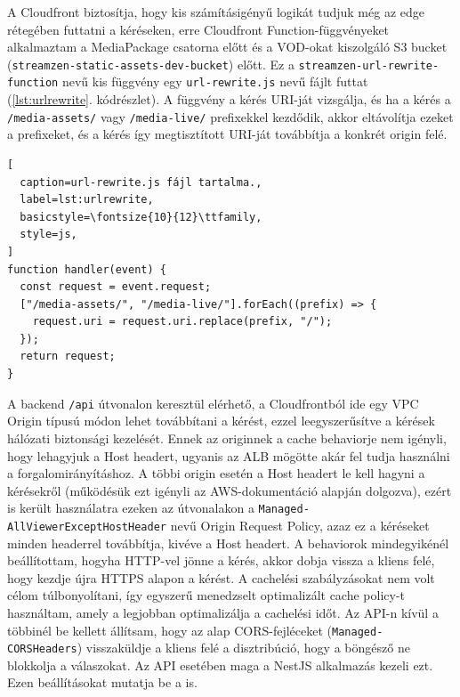 A Cloudfront biztosítja, hogy kis számításigényű logikát tudjuk még az edge rétegében futtatni a kéréseken, erre Cloudfront Function-függvényeket alkalmaztam a MediaPackage csatorna előtt és a VOD-okat kiszolgáló S3 bucket (\verb|streamzen-static-assets-dev-bucket|) előtt. Ez a \verb|streamzen-url-rewrite-function| nevű kis függvény egy \verb|url-rewrite.js| nevű fájlt futtat (\ref{lst:urlrewrite}. kódrészlet). A függvény a kérés URI-ját vizsgálja, és ha a kérés a \verb|/media-assets/| vagy \verb|/media-live/| prefixekkel kezdődik, akkor eltávolítja ezeket a prefixeket, és a kérés így megtisztított URI-ját továbbítja a konkrét origin felé.

\begin{minipage}{0.92\textwidth}
  \begin{lstlisting}[
  caption=url-rewrite.js fájl tartalma.,
  label=lst:urlrewrite,
  basicstyle=\fontsize{10}{12}\ttfamily,
  style=js,
]
function handler(event) {
  const request = event.request;
  ["/media-assets/", "/media-live/"].forEach((prefix) => {
    request.uri = request.uri.replace(prefix, "/");
  });
  return request;
}
\end{lstlisting}
\end{minipage}

A backend \verb|/api| útvonalon keresztül elérhető, a Cloudfrontból ide egy VPC Origin típusú módon lehet továbbítani a kérést, ezzel leegyszerűsítve a kérések hálózati biztonsági kezelését. Ennek az originnek a cache behaviorje nem igényli, hogy lehagyjuk a Host headert, ugyanis az ALB mögötte akár fel tudja használni a forgalomirányításhoz. A többi origin esetén a Host headert le kell hagyni a kérésekről (működésük ezt igényli az AWS-dokumentáció alapján dolgozva), ezért is került használatra ezeken az útvonalakon a \verb|Managed-AllViewerExceptHostHeader| nevű Origin Request Policy, azaz ez a kéréseket minden headerrel továbbítja, kivéve a Host headert. A behaviorok mindegyikénél beállítottam, hogyha HTTP-vel jönne a kérés, akkor dobja vissza a kliens felé, hogy kezdje újra HTTPS alapon a kérést. A cachelési szabályzásokat nem volt célom túlbonyolítani, így egyszerű menedzselt optimalizált cache policy-t használtam, amely a legjobban optimalizálja a cachelési időt. Az API-n kívül a többinél be kellett állítsam, hogy az alap CORS-fejléceket (\verb|Managed-CORSHeaders|) visszaküldje a kliens felé a disztribúció, hogy a böngésző ne blokkolja a válaszokat. Az API esetében maga a NestJS alkalmazás kezeli ezt. Ezen beállításokat mutatja be a  is.

